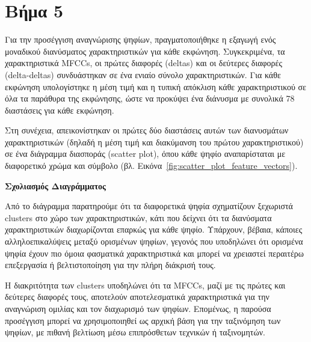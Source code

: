 \documentclass[a4paper,12pt]{article}
\begin{document}
\section*{Βήμα 5}

Για την προσέγγιση αναγνώρισης ψηφίων, πραγματοποιήθηκε η εξαγωγή ενός μοναδικού διανύσματος χαρακτηριστικών για κάθε εκφώνηση. Συγκεκριμένα, τα χαρακτηριστικά MFCCs, οι πρώτες διαφορές (deltas) και οι δεύτερες διαφορές (delta-deltas) συνδυάστηκαν σε ένα ενιαίο σύνολο χαρακτηριστικών. Για κάθε εκφώνηση υπολογίστηκε η μέση τιμή και η τυπική απόκλιση κάθε χαρακτηριστικού σε όλα τα παράθυρα της εκφώνησης, ώστε να προκύψει ένα διάνυσμα με συνολικά 78 διαστάσεις για κάθε εκφώνηση.

Στη συνέχεια, απεικονίστηκαν οι πρώτες δύο διαστάσεις αυτών των διανυσμάτων χαρακτηριστικών (δηλαδή η μέση τιμή και διακύμανση του πρώτου χαρακτηριστικού) σε ένα διάγραμμα διασποράς (scatter plot), όπου κάθε ψηφίο αναπαρίσταται με διαφορετικό χρώμα και σύμβολο (βλ. Εικόνα~\ref{fig:scatter_plot_feature_vectors}).

\textbf{Σχολιασμός Διαγράμματος}

Από το διάγραμμα παρατηρούμε ότι τα διαφορετικά ψηφία σχηματίζουν ξεχωριστά clusters στο χώρο των χαρακτηριστικών, κάτι που δείχνει ότι τα διανύσματα χαρακτηριστικών διαχωρίζονται επαρκώς για κάθε ψηφίο. Υπάρχουν, βέβαια, κάποιες αλληλοεπικαλύψεις μεταξύ ορισμένων ψηφίων, γεγονός που υποδηλώνει ότι ορισμένα ψηφία έχουν πιο όμοια φασματικά χαρακτηριστικά και μπορεί να χρειαστεί περαιτέρω επεξεργασία ή βελτιστοποίηση για την πλήρη διάκρισή τους.

Η διακριτότητα των clusters υποδηλώνει ότι τα MFCCs, μαζί με τις πρώτες και δεύτερες διαφορές τους, 
αποτελούν αποτελεσματικά χαρακτηριστικά για την αναγνώριση ομιλίας και τον διαχωρισμό των ψηφίων. Επομένως, 
η παρούσα προσέγγιση μπορεί να χρησιμοποιηθεί ως αρχική βάση για την ταξινόμηση των ψηφίων, 
με πιθανή βελτίωση μέσω επιπρόσθετων τεχνικών ή ταξινομητών.
\end{document}
